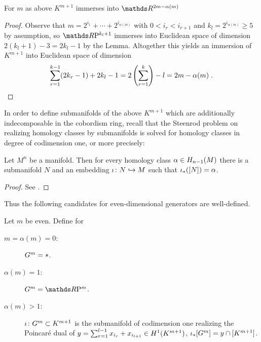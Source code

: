 \begin{Lem}
  For $m$ as above $K^{m+1}$ immerses into $\R^{2m-\alpha(m)}$
  \begin{proof}
    Observe that
    $m=2^{i_1}+\dotsb +2^{i_{\alpha(m)}}$ with $0<i_r< i_{r+1}$ and
    $k_l=2^{i_{\alpha(m)}}\geq 5$ by assumption, so $\RP{k_l+1}$
    immerses into Euclidean space of dimension $2(k_l+1)-3=2k_l-1$ by
    the Lemma.
    Altogether this yields an immersion of $K^{m+1}$ into Euclidean
    space of dimension
  \begin{gather*}
    \sum_{r=1}^{k-1}(2k_r-1) + 2k_l-1
    = 2\left(\sum_{r=1}^{k}\right) - l
    = 2m - \alpha(m)
    \;.
    \qedhere
  \end{gather*}
  \end{proof}
\end{Lem}


In order to define submanifolds of the above $K^{m+1}$ which are
additionally indecomposable in the cobordism ring, recall that the
Steenrod problem on realizing homology classes by submanifolds is
solved for homology classes in degree of codimension one, or more
precisely:
\begin{Lem}
  Let $M^n$ be a manifold. Then for every homology class
  $\alpha\in H_{n-1}(M)$ there is a submanifold $N$ and an embedding
  $\iota\colon N\hookrightarrow M$ such that ${\iota}_*([N]) = \alpha$.
  \begin{proof}
    See \cite[Theorem~II.26]{thom}.
  \end{proof}
\end{Lem}

Thus the following candidates for even-dimensional generators are
well-defined.
\begin{Def}
  Let $m$ be even. Define for
  \begin{description}
  \item[$m=\alpha(m)=0$:] $G^{m} = *$.
  \item[$\alpha(m)=1$:] $\G m = \RP m$.
  \item[$\alpha(m)>1$:]
    ${\iota}\colon G^{m}\subset K^{m+1}$ is the submanifold of
    codimension one realizing the Poincaré dual of
    $y=\sum_{r=1}^{l-1}x_{i_r} + x_{i_{l+1}}\in H^1(K^{m+1})$,
    \idest ${{\iota}}_*[G^{m}]=y\cap[K^{m+1}]$.
  \end{description}
\end{Def}


